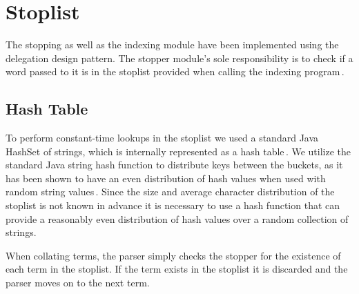 
\section{Stoplist}
\label{sec:stopping}

The stopping as well as the indexing module have been implemented using the delegation design pattern. The stopper module's sole responsibility is to check if a word passed to it is in the stoplist provided when calling the indexing program\,\cite{princeton}.

\subsection*{Hash Table}
To perform constant-time lookups in the stoplist we used a standard Java HashSet of strings, which is internally represented as a hash table\,\cite{hashset}. We utilize the standard Java string hash function to distribute keys between the buckets, as it has been shown to have an even distribution of hash values when used with random string values\,\cite{javamex}. Since the size and average character distribution of the stoplist is not known in advance it is necessary to use a hash function that can provide a reasonably even distribution of hash values over a random collection of strings.

When collating terms, the parser simply checks the stopper for the existence of each term in the stoplist. If the term exists in the stoplist it is discarded and the parser moves on to the next term.
